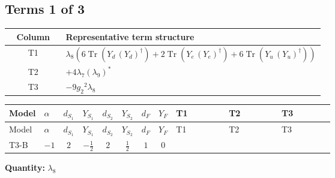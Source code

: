 \documentclass[8pt]{article}
\begin{document}
\begin{landscape}
\subsection*{Terms 1 of 3}
\begin{center}
\begin{tabular}{@{}c >{\raggedright\arraybackslash}p{0.82\linewidth}@{}}
\toprule
Column & Representative term structure \\
\midrule
T1 & \(\displaystyle {\lambda_{8}} (6 \operatorname{Tr}\!\left({Y_d}\,\left({Y_d}\right)^{\dagger}\right)+2 \operatorname{Tr}\!\left({Y_e}\,\left({Y_e}\right)^{\dagger}\right)+6 \operatorname{Tr}\!\left({Y_u}\,\left({Y_u}\right)^{\dagger}\right))\) \\
\midrule
T2 & \(\displaystyle +4 {\lambda_{7}} \left({\lambda_{9}}\right)^{*}\) \\
\midrule
T3 & \(\displaystyle -9 {g_2}^2 {\lambda_{8}}\) \\
\midrule
\bottomrule
\end{tabular}
\end{center}
\smallskip
\tiny
\begin{longtable}{@{}llcccccc >{\raggedright\arraybackslash}p{0.21\linewidth} >{\raggedright\arraybackslash}p{0.21\linewidth} >{\raggedright\arraybackslash}p{0.21\linewidth}@{}}
\toprule
Model & $\alpha$ & $d_{S_1}$ & $Y_{S_1}$ & $d_{S_2}$ & $Y_{S_2}$ & $d_F$ & $Y_F$ & T1 & T2 & T3 \\
\midrule
\endfirsthead
\toprule
Model & $\alpha$ & $d_{S_1}$ & $Y_{S_1}$ & $d_{S_2}$ & $Y_{S_2}$ & $d_F$ & $Y_F$ & T1 & T2 & T3 \\
\midrule
\endhead
T3-B & $-1$ & $2$ & $-\frac{1}{2}$ & $2$ & $\frac{1}{2}$ & $1$ & $0$ & \scriptsize\adjustbox{max width=\linewidth}{$\begin{gathered} {\lambda_{8}} (6 \operatorname{Tr}\!\left({Y_d}\,\left({Y_d}\right)^{\dagger}\right)+2 \operatorname{Tr}\!\left({Y_e}\,\left({Y_e}\right)^{\dagger}\right)+6 \operatorname{Tr}\!\left({Y_u}\,\left({Y_u}\right)^{\dagger}\right))\end{gathered}$} & \scriptsize\adjustbox{max width=\linewidth}{$\begin{gathered} +4 {\lambda_{7}} \left({\lambda_{9}}\right)^{*}\end{gathered}$} & \scriptsize\adjustbox{max width=\linewidth}{$\begin{gathered} -9 {g_2}^2 {\lambda_{8}}\end{gathered}$} \\
\midrule
\bottomrule
\end{longtable}
\clearpage
\noindent\textbf{Quantity: }$\lambda_{8}$\par\smallskip

\end{landscape}
\end{document}

